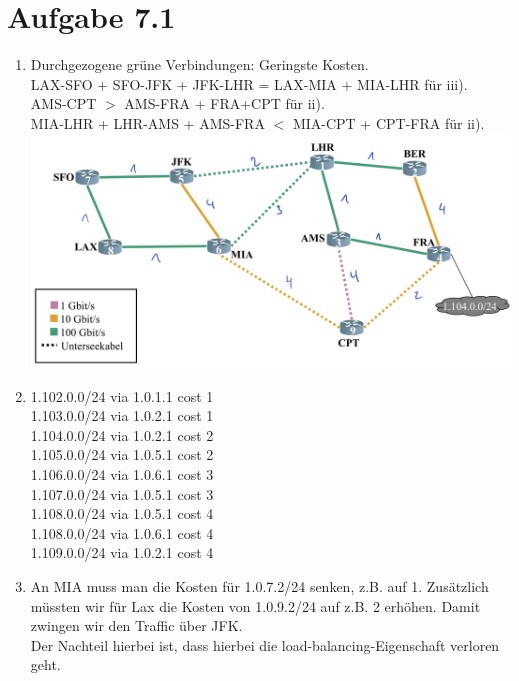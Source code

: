 \documentclass[12pt, a4paper]{article}
\begin{document}
\section*{Aufgabe 7.1}
\begin{enumerate}[label=\alph*)]
	\item	Durchgezogene grüne Verbindungen: Geringste Kosten. \\
			LAX-SFO + SFO-JFK + JFK-LHR = LAX-MIA + MIA-LHR für iii). \\
			AMS-CPT $>$ AMS-FRA + FRA+CPT für ii). \\
			MIA-LHR + LHR-AMS + AMS-FRA $<$ MIA-CPT + CPT-FRA für ii). \\
			\includegraphics[scale=0.35]{7.1_a).png}
	\item	1.102.0.0/24 via 1.0.1.1 cost 1 \\
			1.103.0.0/24 via 1.0.2.1 cost 1 \\
			1.104.0.0/24 via 1.0.2.1 cost 2 \\
			1.105.0.0/24 via 1.0.5.1 cost 2 \\
			1.106.0.0/24 via 1.0.6.1 cost 3 \\
			1.107.0.0/24 via 1.0.5.1 cost 3 \\
			1.108.0.0/24 via 1.0.5.1 cost 4 \\
			1.108.0.0/24 via 1.0.6.1 cost 4 \\
			1.109.0.0/24 via 1.0.2.1 cost 4 \\
	\item	An MIA muss man die Kosten für 1.0.7.2/24 senken, z.B. auf 1. Zusätzlich müssten wir für Lax die Kosten von 1.0.9.2/24 auf z.B. 2 erhöhen. Damit zwingen wir den Traffic über JFK. \\
			Der Nachteil hierbei ist, dass hierbei die load-balancing-Eigenschaft verloren geht.
\end{enumerate}


\newpage
\end{document}
